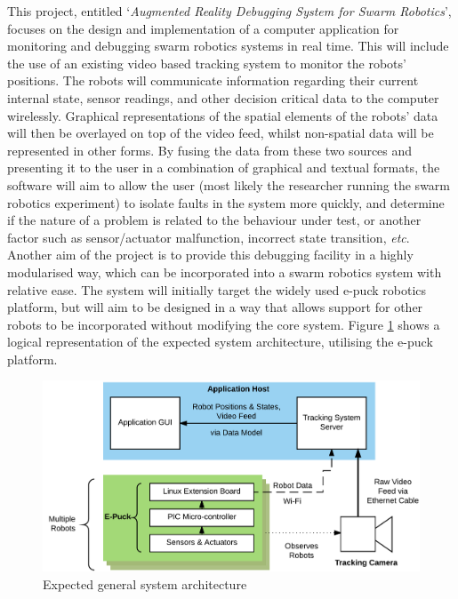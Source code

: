 \documentclass[hidelinks,10pt]{article}
\begin{document}
This project, entitled `\textit{Augmented Reality Debugging System for Swarm Robotics}', focuses on the design and implementation of a computer application for monitoring and debugging swarm robotics systems in real time. This will include the use of an existing video based tracking system to monitor the robots' positions. The robots will communicate information regarding their current internal state, sensor readings, and other decision critical data to the computer wirelessly. Graphical representations of the spatial elements of the robots' data will then be overlayed on top of the video feed, whilst non-spatial data will be represented in other forms. By fusing the data from these two sources and presenting it to the user in a combination of graphical and textual formats, the software will aim to allow the user (most likely the researcher running the swarm robotics experiment) to isolate faults in the system more quickly, and determine if the nature of a problem is related to the behaviour under test, or another factor such as sensor/actuator malfunction, incorrect state transition, \textit{etc}. Another aim of the project is to provide this debugging facility in a highly modularised way, which can be incorporated into a swarm robotics system with relative ease. The system will initially target the widely used e-puck \cite{EPuck} robotics platform, but will aim to be designed in a way that allows support for other robots to be incorporated without modifying the core system. Figure \ref{fig:SystemArchitecture} shows a logical representation of the expected system architecture, utilising the e-puck platform.

\begin{figure}[H]
	\begin{center}
	\includegraphics[scale=0.8]{SystemArchitecture.png}
	\caption{Expected general system architecture}
	\label{fig:SystemArchitecture}
	\end{center}
\end{figure}
\end{document}
